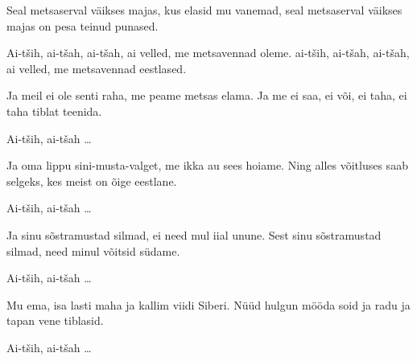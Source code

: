Seal metsaserval v\"aikses majas,
kus elasid mu vanemad,
seal metsaserval v\"aikses majas
on pesa teinud punased.

Ai-t\v{s}ih, ai-t\v{s}ah, ai-t\v{s}ah, ai velled,
me metsavennad oleme.
ai-t\v{s}ih, ai-t\v{s}ah, ai-t\v{s}ah, ai velled,
me metsavennad eestlased.

Ja meil ei ole senti raha,
me peame metsas elama.
Ja me ei saa, ei v\~oi, ei taha,
ei taha tiblat teenida.

Ai-t\v{s}ih, ai-t\v{s}ah \ldots

Ja oma lippu sini-musta-valget,
me ikka au sees hoiame.
Ning alles v\~oitluses saab selgeks,
kes meist on \~oige eestlane.

Ai-t\v{s}ih, ai-t\v{s}ah \ldots

Ja sinu s\~ostramustad silmad,
ei need mul iial unune.
Sest sinu s\~ostramustad silmad,
need minul v\~oitsid s\"udame.

Ai-t\v{s}ih, ai-t\v{s}ah \ldots

Mu ema, isa lasti maha
ja kallim viidi Siberi.
N\"u\"ud hulgun m\"o\"oda soid ja radu
ja tapan vene tiblasid.

Ai-t\v{s}ih, ai-t\v{s}ah \ldots